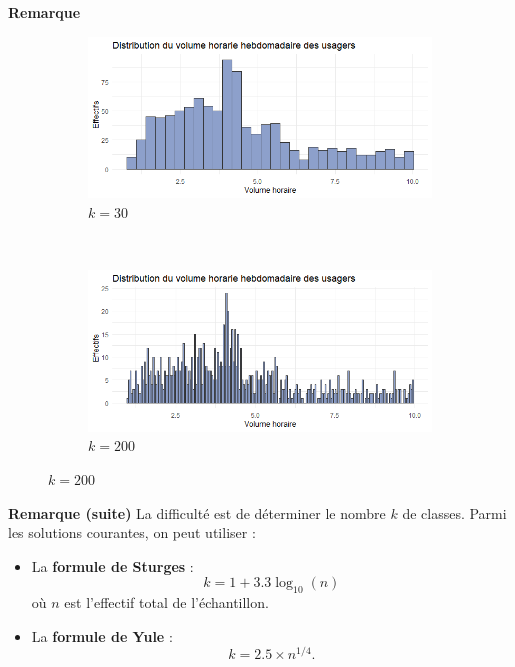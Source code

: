 \documentclass[aspectratio=169,xcolor=dvipsnames]{beamer}
\begin{document}
\begin{frame}
\begin{exampleblock}{\textbf{Remarque}}
\begin{figure}
			\begin{subfigure}{0.4\textwidth}
			\includegraphics[width=\textwidth]{histo_gym_rk3.png}
			\caption{{\tiny $k=30$}}			
			\end{subfigure}~
			\begin{subfigure}{0.4\textwidth}
			\includegraphics[width=\textwidth]{histo_gym_rk4.png}
			\caption{{\tiny $k=200$}}			
			\end{subfigure}
		\end{figure}
	\end{exampleblock}
\end{frame}

\begin{frame}
	\begin{exampleblock}{\textbf{Remarque (suite)}}
	La difficulté est de déterminer le nombre $k$ de classes. Parmi les solutions courantes, on peut utiliser :
		\begin{itemize}
		\item La \textbf{formule de Sturges} :
			\[k=1+3.3 \log_{10}(n)\]
		où $n$ est l'effectif total de l'échantillon.
		\item La \textbf{formule de Yule} :
			\[k = 2.5 \times n^{1/4}.\]
		\end{itemize}			
	\end{exampleblock}
\end{frame}
\end{document}
